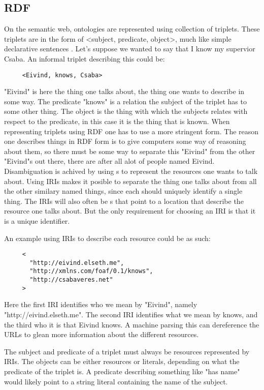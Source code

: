 \subsection{RDF}
On the semantic web, ontologies are represented using collection of  triplets. 
These triplets are in the form of <subject, predicate, object>, much like simple declarative sentences \citep{Berners-Lee2001}. 
Let's suppose we wanted to say that I know my supervior Csaba.
An informal triplet describing this could be:
\begin{verbatim}
     <Eivind, knows, Csaba> 
\end{verbatim}
"Eivind" is here the thing one talks about, the thing one wants to describe in some way.
The predicate "knows" is a relation the subject of the triplet has to some other thing.
The object is the thing with which the subjects relates with respect to the predicate, in this case it is the thing that is known.
When representing triplets using RDF one has to use a more stringent form. 
The reason one describes things in RDF form is to give computers some way of reasoning about them, 
so there must be some way to separate this "Eivind" from the other "Eivind"s out there,
there are after all alot of people named Eivind.
Disambiguation is achived by using s to represent the resources one wants to talk about.
Using IRIs makes it posible to separate the thing one talks about from all the other similary named things, 
since each should uniquely identify a single thing.
The IRIs will also often be s 
that point to a location that describe the resource one talks about.
But the only requirement for choosing an IRI is that it is a unique identifier. 

An example using IRIs to describe each resource could be as such:
\begin{verbatim}
     < 
       "http://eivind.elseth.me",
       "http://xmlns.com/foaf/0.1/knows",
       "http://csabaveres.net" 
     > 
\end{verbatim}
Here the first IRI identifies who we mean by "Eivind", namely "http://eivind.elseth.me".
The second IRI identifies what we mean by knows, and the third who it is that Eivind knows.
A machine parsing this can dereference the URLs to glean more information about the different resources.

The subject and predicate of a triplet must always be resources represented by IRIs.
The objects can be either resources or literals, depending on what the predicate of the triplet is.
A predicate describing something like "has name" would likely point to a string literal containing the name of the subject\citep{Hebeler2009Chp3}.

